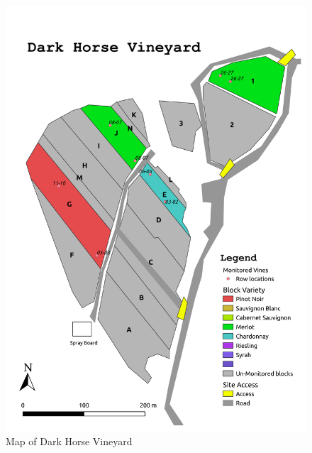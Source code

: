 \documentclass[11pt,letter]{article}
\begin{document}
\begin{figure} [h!]
   \includegraphics[width = \linewidth]{DH_map.jpg}
  \caption{Map of Dark Horse Vineyard}
  \label{fig:DHmap}
\end{figure}
\end{document}
